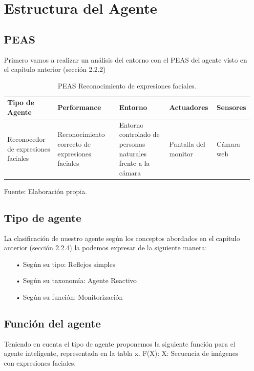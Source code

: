 \section{Estructura del Agente}
\subsection{PEAS}
Primero vamos a realizar un análisis del entorno con el PEAS del agente visto en el capítulo anterior (sección 2.2.2) 

\begin{table}[ht!]
\centering
\caption{PEAS Reconocimiento de expresiones faciales.} \vskip 0.1cm
\begin{tabular}{|p{2.7cm} |p{3cm} |p{3.8cm} |p{2cm} |p{2.1cm}|}  \hline 
\bf Tipo de Agente & \bf Performance & \bf Entorno & \bf Actuadores & \bf Sensores \\ \hline 
Reconocedor de expresiones faciales & Reconocimiento correcto de expresiones faciales & Entorno controlado de personas naturales frente a la cámara & Pantalla del monitor & Cámara web \\ \hline
\end{tabular} 
\begin{center}
{\small{Fuente: Elaboración propia.}}
\end{center}
\end{table}

\subsection{Tipo de agente}
La clasificación de nuestro agente según los conceptos abordados en el capítulo anterior (sección 2.2.4)  la podemos expresar de la siguiente manera:

\begin{itemize}
\item[•] Según su tipo: Reflejos simples
\item[•] Según su taxonomía: Agente Reactivo
\item[•] Según su función: Monitorización
\end{itemize}

\subsection{Función del agente}
Teniendo en cuenta el tipo de agente proponemos la siguiente función para el agente inteligente, representada en la tabla x.
\vskip 0.1cm
F(X): X: Secuencia de imágenes con expresiones faciales.

